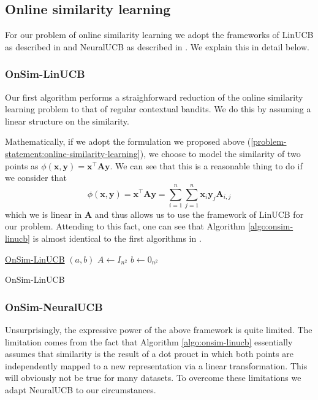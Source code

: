 \documentclass{article}
\begin{document}
\subsection{Online similarity learning}
For our problem of online similarity learning we adopt the frameworks of  LinUCB  as described in \cite{linucb} and  NeuralUCB as described in \cite{neuralucb}. We explain this in detail below.

\subsubsection{OnSim-LinUCB}
Our first algorithm performs a straighforward reduction of the online similarity learning problem to that of regular contextual bandits. We do this by assuming a linear structure on the similarity.

Mathematically, if we adopt the formulation we proposed above (\ref{problem-statement:online-similarity-learning}), we choose to model the similarity of two points as  $\phi(\mathbf{x}, \mathbf{y}) = \mathbf{x}^\top \mathbf{A} \mathbf{y}$.
We can see that this is a reasonable thing to do if we consider that
\[\phi(\mathbf{x}, \mathbf{y}) = \mathbf{x}^\top \mathbf{A} \mathbf{y} = \sum_{i =1}^n\sum_{j=1}^n \mathbf{x}_i \mathbf{y}_j \mathbf{A}_{i,j} \]
which we is linear in $\mathbf{A}$ and thus allows us to use the framework of LinUCB for our problem.
Attending to this fact, one can see that Algorithm \ref{algo:onsim-linucb} is almost identical to the first algorithms in \cite{linucb}.
\begin{algorithm}
  \label{algo:onsim-linucb}
    \underline{OnSim-LinUCB} $(a,b)$\;
    $A \gets I_{n^2}$\;
    $b \gets 0_{n^2}$\;
    \caption{OnSim-LinUCB}
\end{algorithm}

\subsubsection{OnSim-NeuralUCB}
Unsurprisingly, the expressive power of the above framework is quite limited.
The limitation comes from the fact that Algorithm \ref{algo:onsim-linucb} essentially assumes that similarity is the result
of a dot prouct in which both points are independently mapped to a new representation via a linear transformation. This will obviously not be true for many datasets.
To overcome these limitations we adapt NeuralUCB \cite{neuralucb} to our circumstances.
\end{document}

